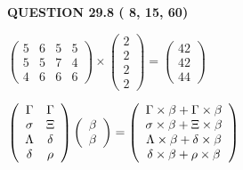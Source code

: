 \documentclass[12pt]{article}
\begin{document}
 
 
  
\vspace{0.2in}
  
{\textbf{\Large{QUESTION
29.8 
 (          8,         15,         60)
}}}
  
  
 
 
\noindent{}

 
$\left( \begin{array}{ccccccccccccccc}
           5 & 
           6 & 
           5 & 
           5 \\ 
           5 & 
           5 & 
           7 & 
           4 \\ 
           4 & 
           6 & 
           6 & 
           6
\end{array}\right) \times
\left( \begin{array}{c}
           2 \\ 
           2 \\ 
           2 \\ 
           2
\end{array}\right)  =
\left( \begin{array}{c}
          42 \\ 
          42 \\ 
          44
\end{array}\right)  $
 
$  %
 \left( \begin{array}
 {
 c
 c
 }
 \Gamma & 
 \Gamma \\ 
 \sigma & 
                    \Xi \\ 
 \Lambda & 
 \delta \\ 
 \delta & 
 \rho
 \end{array} \right)
 \left( \begin{array}
 {
 c
 }
 \beta \\ 
 \beta
 \end{array} \right)
=
  \left( \begin{array}
 {
 c
 }
 \Gamma \times  \beta   +  \Gamma \times  \beta \\ 
 \sigma \times  \beta   +                     \Xi \times  \beta \\ 
 \Lambda \times  \beta   +  \delta \times  \beta \\ 
 \delta \times  \beta   +  \rho \times  \beta
 \end{array} \right)
$
 
 
 
 
 
\end{document}
